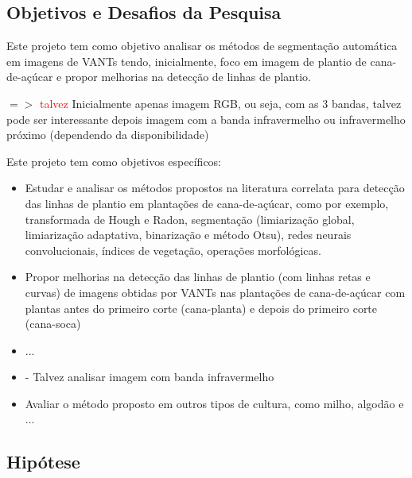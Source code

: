 \documentclass[12pt, a4paper, english, brazil]{article}
\newcommand{\textRed}[1]{{{\color{red} #1 }}}
\begin{document}
\subsection{Objetivos e Desafios da Pesquisa}

Este projeto tem como objetivo analisar os métodos de segmentação automática em imagens de VANTs tendo, inicialmente, foco em imagem de plantio de cana-de-açúcar e propor melhorias na detecção de linhas de plantio. 

$=>$ \textcolor{red}{talvez} Inicialmente apenas imagem RGB, ou seja, com as 3 bandas, talvez pode ser interessante depois imagem com a banda infravermelho ou infravermelho próximo (dependendo da disponibilidade)

Este projeto tem como objetivos específicos:
\begin{itemize}
    \item Estudar e analisar os métodos propostos na literatura correlata para detecção das linhas de plantio em plantações de cana-de-açúcar, como por exemplo, transformada de Hough e Radon, segmentação (limiarização global, limiarização adaptativa, binarização e método Otsu), redes neurais convolucionais, índices de vegetação, operações morfológicas.
    \item Propor melhorias na detecção das linhas de plantio (com linhas retas e curvas) de imagens obtidas por VANTs nas plantações de cana-de-açúcar com plantas antes do primeiro corte (cana-planta) e depois do primeiro corte (cana-soca)
    \item ...
    \item - \textRed{Talvez analisar imagem com banda infravermelho}
    \item Avaliar o método proposto em outros tipos de cultura, como milho, algodão e ...
\end{itemize}

\subsection{Hipótese}
\end{document}
